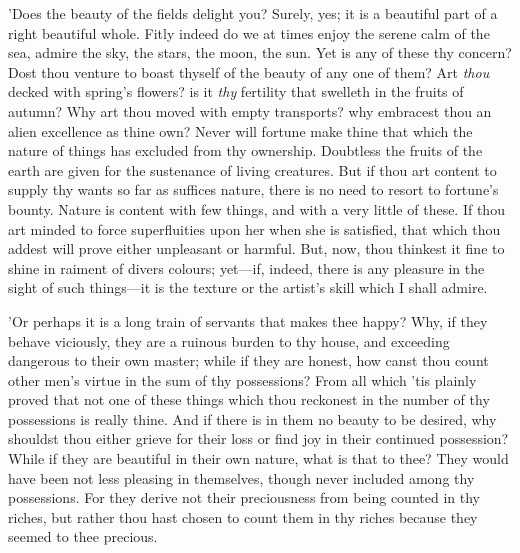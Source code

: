 'Does the beauty of the fields delight you? Surely, yes; it is a
beautiful part of a right beautiful whole. Fitly indeed do we at times
enjoy the serene calm of the sea, admire the sky, the stars, the moon,
the sun. Yet is any of these thy concern? Dost thou venture to boast
thyself of the beauty of any one of them? Art \emph{thou} decked with
spring's flowers? is it \emph{thy} fertility that swelleth in the fruits of
autumn? Why art thou moved with empty transports? why embracest thou an
alien excellence as thine own? Never will fortune make thine that which
the nature of things has excluded from thy ownership. Doubtless the
fruits of the earth are given for the sustenance of living creatures.
But if thou art content to supply thy wants so far as suffices nature,
there is no need to resort to fortune's bounty. Nature is content with
few things, and with a very little of these. If thou art minded to force
superfluities upon her when she is satisfied, that which thou addest
will prove either unpleasant or harmful. But, now, thou thinkest it
fine to shine in raiment of divers colours; yet—if, indeed, there is
any pleasure in the sight of such things—it is the texture or the
artist's skill which I shall admire.

'Or perhaps it is a long train of servants that makes thee happy? Why,
if they behave viciously, they are a ruinous burden to thy house, and
exceeding dangerous to their own master; while if they are honest, how
canst thou count other men's virtue in the sum of thy possessions? From
all which 'tis plainly proved that not one of these things which thou
reckonest in the number of thy possessions is really thine. And if there
is in them no beauty to be desired, why shouldst thou either grieve for
their loss or find joy in their continued possession? While if they are
beautiful in their own nature, what is that to thee? They would have
been not less pleasing in themselves, though never included among thy
possessions. For they derive not their preciousness from being counted
in thy riches, but rather thou hast chosen to count them in thy riches
because they seemed to thee precious.

